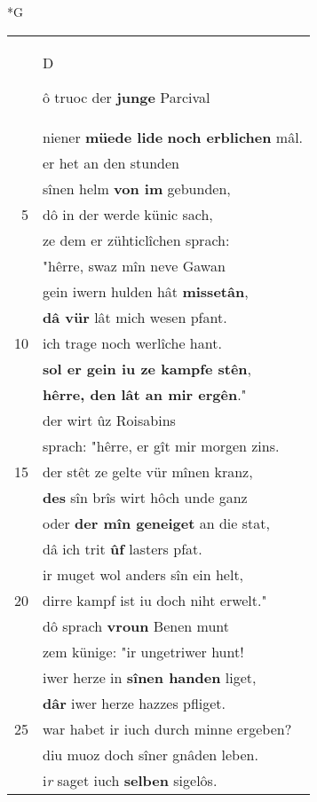 \documentclass[8pt,a4paper,notitlepage]{article}
\begin{document}
\begin{table}[ht]
\begin{minipage}[t]{0.5\linewidth}
\small
\begin{center}*G
\end{center}
\begin{tabular}{rl}
 & \begin{large}D\end{large}ô truoc der \textbf{junge} Parcival\\ 
 & niener \textbf{müede lide} \textbf{noch erblichen} mâl.\\ 
 & er het an den stunden\\ 
 & sînen helm \textbf{von im} gebunden,\\ 
5 & dô in der werde künic sach,\\ 
 & ze dem er zühticlîchen sprach:\\ 
 & "hêrre, swaz mîn neve Gawan\\ 
 & gein iwern hulden hât \textbf{missetân},\\ 
 & \textbf{dâ vür} lât mich wesen pfant.\\ 
10 & ich trage noch werlîche hant.\\ 
 & \textbf{sol er gein iu ze kampfe stên},\\ 
 & \textbf{hêrre, den lât an mir ergên}."\\ 
 & der wirt ûz Roisabins\\ 
 & sprach: "hêrre, er gît mir morgen zins.\\ 
15 & der stêt ze gelte vür mînen kranz,\\ 
 & \textbf{des} sîn brîs wirt hôch unde ganz\\ 
 & oder \textbf{der mîn geneiget} an die stat,\\ 
 & dâ ich trit \textbf{ûf} lasters pfat.\\ 
 & ir muget wol anders sîn ein helt,\\ 
20 & dirre kampf ist iu doch niht erwelt."\\ 
 & dô sprach \textbf{vroun} Benen munt\\ 
 & zem künige: "ir ungetriwer hunt!\\ 
 & iwer herze in \textbf{sînen handen} liget,\\ 
 & \textbf{dâr} iwer herze hazzes pfliget.\\ 
25 & war habet ir iuch durch minne ergeben?\\ 
 & diu muoz doch sîner gnâden leben.\\ 
 & i\textit{r} saget iuch \textbf{selben} sigelôs.\\ 

\end{tabular}
\end{minipage}
\end{table}
\end{document}
